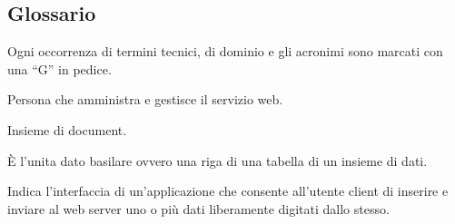 	\subsection{Glossario}
	Ogni occorrenza di termini tecnici, di dominio e gli acronimi sono marcati con una ``G'' in pedice.

	Persona che amministra e gestisce il servizio web.

	Insieme di document.

	\`E l'unita dato basilare ovvero una riga di una tabella di un insieme di dati.

	Indica l'interfaccia di un'applicazione che consente all'utente client di inserire e inviare al web server uno o più dati liberamente digitati dallo stesso. 


